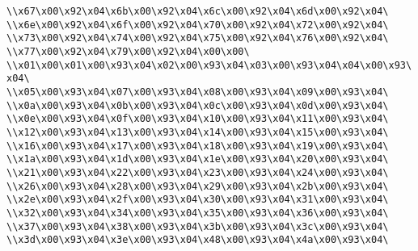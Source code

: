 \verb|\\x67\x00\x92\x04\x6b\x00\x92\x04\x6c\x00\x92\x04\x6d\x00\x92\x04\|\newline
\verb|\\x6e\x00\x92\x04\x6f\x00\x92\x04\x70\x00\x92\x04\x72\x00\x92\x04\|\newline
\verb|\\x73\x00\x92\x04\x74\x00\x92\x04\x75\x00\x92\x04\x76\x00\x92\x04\|\newline
\verb|\\x77\x00\x92\x04\x79\x00\x92\x04\x00\x00\|\newline
\verb|\\x01\x00\x01\x00\x93\x04\x02\x00\x93\x04\x03\x00\x93\x04\x04\x00\x93\x04\|\newline
\verb|\\x05\x00\x93\x04\x07\x00\x93\x04\x08\x00\x93\x04\x09\x00\x93\x04\|\newline
\verb|\\x0a\x00\x93\x04\x0b\x00\x93\x04\x0c\x00\x93\x04\x0d\x00\x93\x04\|\newline
\verb|\\x0e\x00\x93\x04\x0f\x00\x93\x04\x10\x00\x93\x04\x11\x00\x93\x04\|\newline
\verb|\\x12\x00\x93\x04\x13\x00\x93\x04\x14\x00\x93\x04\x15\x00\x93\x04\|\newline
\verb|\\x16\x00\x93\x04\x17\x00\x93\x04\x18\x00\x93\x04\x19\x00\x93\x04\|\newline
\verb|\\x1a\x00\x93\x04\x1d\x00\x93\x04\x1e\x00\x93\x04\x20\x00\x93\x04\|\newline
\verb|\\x21\x00\x93\x04\x22\x00\x93\x04\x23\x00\x93\x04\x24\x00\x93\x04\|\newline
\verb|\\x26\x00\x93\x04\x28\x00\x93\x04\x29\x00\x93\x04\x2b\x00\x93\x04\|\newline
\verb|\\x2e\x00\x93\x04\x2f\x00\x93\x04\x30\x00\x93\x04\x31\x00\x93\x04\|\newline
\verb|\\x32\x00\x93\x04\x34\x00\x93\x04\x35\x00\x93\x04\x36\x00\x93\x04\|\newline
\verb|\\x37\x00\x93\x04\x38\x00\x93\x04\x3b\x00\x93\x04\x3c\x00\x93\x04\|\newline
\verb|\\x3d\x00\x93\x04\x3e\x00\x93\x04\x48\x00\x93\x04\x4a\x00\x93\x04\|\newline
